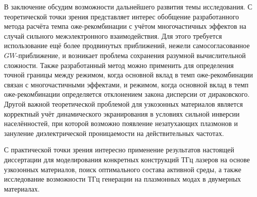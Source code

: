 В заключение обсудим возможности дальнейшего развития темы исследования. С теоретической точки зрения представляет интерес обобщение разработанного метода расчёта темпа оже-рекомбинации с учётом многочастичных эффектов на случай сильного межэлектронного взаимодействия. Для этого требуется использование ещё более продвинутых приближений, нежели самосогласованное $GW$-приближение, и возникает проблема сохранения разумной вычислительной сложности. Также разработанный метод можно применить для определения точной границы между режимом, когда основной вклад в темп оже-рекомбинации связан с многочастичными эффектами, и режимом, когда основной вклад в темп оже-рекомбинации определяется отклонением закона дисперсии от дираковского. Другой важной теоретической проблемой для узкозонных материалов является корректный учёт динамического экранирования в условиях сильной инверсии населённостей, при которой возможно появление незатухающих плазмонов и зануление диэлектрической проницаемости на действительных частотах.

С практической точки зрения интересно применение результатов настоящей диссертации для моделирования конкретных конструкций ТГц лазеров на основе узкозонных материалов, поиск оптимального состава активной среды, а также исследование возможности ТГц генерации на плазмонных модах в двумерных материалах.
